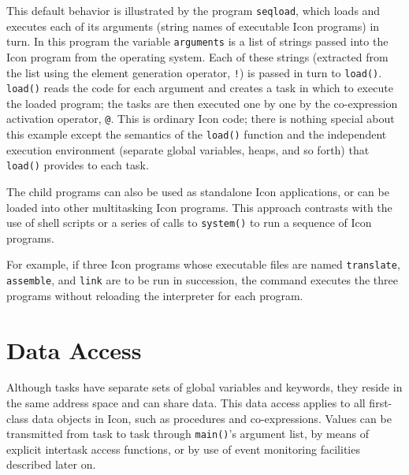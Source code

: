 
This default behavior is illustrated by the program {\tt seqload},
which loads and executes each of its arguments (string names of
executable Icon programs) in turn.  In this program the variable
{\tt arguments} is a list of strings passed into the Icon program from
the operating system.  Each of these strings (extracted from the list
using the element generation operator, {\tt !}) is passed in turn to
{\tt load()}.  {\tt load()} reads the code for each argument and
creates a task in which to execute the loaded program; the tasks are
then executed one by one by the co-expression activation operator,
{\tt @}.  This is ordinary Icon code; there is nothing special about
this example except the semantics of the {\tt load()} function and the
independent execution environment (separate global variables, heaps,
and so forth) that {\tt load()} provides to each task.

The child programs can also be used as standalone Icon applications, or can
be loaded into other multitasking Icon programs.  This approach contrasts
with the use of shell scripts or a series of calls to {\tt system()} to run
a sequence of Icon programs.


For example, if three Icon programs whose executable files are named
{\tt translate}, {\tt assemble}, and {\tt link} are to be run in
succession, the command
\noindent executes the three programs without reloading the
interpreter for each program.




\section{Data Access}

Although tasks have separate sets of global variables and keywords,
they reside in the same address space and can share data.
This data access applies to all first-class data objects in Icon, such
as procedures and co-expressions.  Values can be transmitted from
task to task through {\tt main()}'s argument list,
by means of explicit intertask access functions, or by
use of event monitoring facilities described later on.

